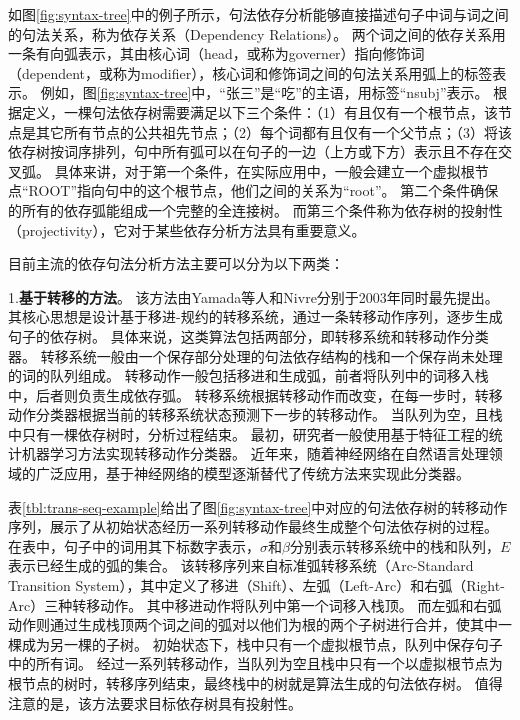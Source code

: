 如图\ref{fig:syntax-tree}中的例子所示，句法依存分析能够直接描述句子中词与词之间的句法关系，称为依存关系（Dependency Relations）。
两个词之间的依存关系用一条有向弧表示，其由核心词（head，或称为governer）指向修饰词（dependent，或称为modifier），核心词和修饰词之间的句法关系用弧上的标签表示。
例如，图\ref{fig:syntax-tree}中，“张三”是“吃”的主语，用标签“nsubj”表示。
根据定义，一棵句法依存树需要满足以下三个条件：（1）有且仅有一个根节点，该节点是其它所有节点的公共祖先节点；（2）每个词都有且仅有一个父节点；（3）将该依存树按词序排列，句中所有弧可以在句子的一边（上方或下方）表示且不存在交叉弧。
具体来讲，对于第一个条件，在实际应用中，一般会建立一个虚拟根节点“ROOT”指向句中的这个根节点，他们之间的关系为“root”。
第二个条件确保的所有的依存弧能组成一个完整的全连接树。
而第三个条件称为依存树的投射性（projectivity），它对于某些依存分析方法具有重要意义。

目前主流的依存句法分析方法主要可以分为以下两类：

1.\textbf{基于转移的方法}。
该方法由Yamada等人\cite{yamada-etal-2003-statistical}和Nivre\cite{nivre-2003-efficient}分别于2003年同时最先提出。
其核心思想是设计基于移进-规约的转移系统，通过一条转移动作序列，逐步生成句子的依存树。
具体来说，这类算法包括两部分，即转移系统和转移动作分类器。
转移系统一般由一个保存部分处理的句法依存结构的栈和一个保存尚未处理的词的队列组成。
转移动作一般包括移进和生成弧，前者将队列中的词移入栈中，后者则负责生成依存弧。
转移系统根据转移动作而改变，在每一步时，转移动作分类器根据当前的转移系统状态预测下一步的转移动作。
当队列为空，且栈中只有一棵依存树时，分析过程结束。
最初，研究者一般使用基于特征工程的统计机器学习方法实现转移动作分类器。
近年来，随着神经网络在自然语言处理领域的广泛应用，基于神经网络的模型逐渐替代了传统方法来实现此分类器。

表\ref{tbl:trans-seq-example}给出了图\ref{fig:syntax-tree}中对应的句法依存树的转移动作序列，展示了从初始状态经历一系列转移动作最终生成整个句法依存树的过程。
在表中，句子中的词用其下标数字表示，$\sigma$和$\beta$分别表示转移系统中的栈和队列，$E$表示已经生成的弧的集合。
该转移序列来自标准弧转移系统（Arc-Standard Transition System），其中定义了移进（Shift）、左弧（Left-Arc）和右弧（Right-Arc）三种转移动作。
其中移进动作将队列中第一个词移入栈顶。
而左弧和右弧动作则通过生成栈顶两个词之间的弧对以他们为根的两个子树进行合并，使其中一棵成为另一棵的子树。
初始状态下，栈中只有一个虚拟根节点，队列中保存句子中的所有词。
经过一系列转移动作，当队列为空且栈中只有一个以虚拟根节点为根节点的树时，转移序列结束，最终栈中的树就是算法生成的句法依存树。
值得注意的是，该方法要求目标依存树具有投射性。

